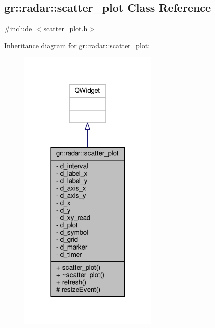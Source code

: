 \subsection{gr\+:\+:radar\+:\+:scatter\+\_\+plot Class Reference}
\label{classgr_1_1radar_1_1scatter__plot}


{\ttfamily \#include $<$scatter\+\_\+plot.\+h$>$}



Inheritance diagram for gr\+:\+:radar\+:\+:scatter\+\_\+plot\+:
\nopagebreak
\begin{figure}[H]
\begin{center}
\leavevmode
\includegraphics[width=190pt]{d6/d5b/classgr_1_1radar_1_1scatter__plot__inherit__graph}
\end{center}
\end{figure}


